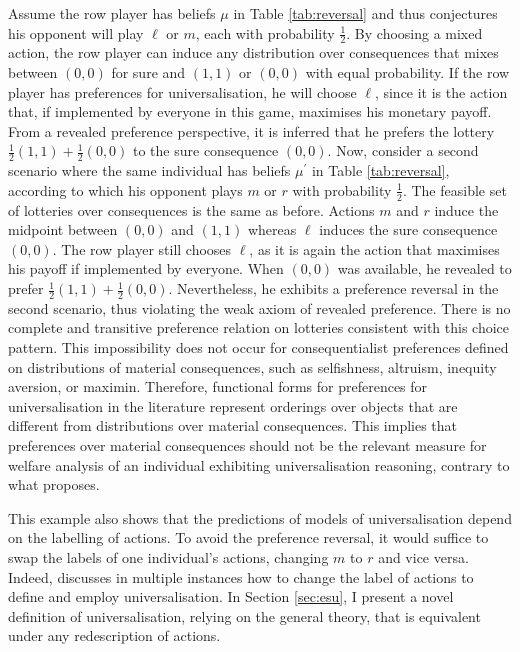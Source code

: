 Assume the row player has beliefs \(\mu\) in Table \ref{tab:reversal} and thus conjectures his opponent will play \(\ell\) or \(m\), each with probability \(\frac{1}{2}\). By choosing a mixed action, the row player can induce any distribution over consequences that mixes between \((0,0)\) for sure and \((1,1)\) or \((0,0)\) with equal probability. If the row player has preferences for universalisation, he will choose \(\ell\), since it is the action that, if implemented by everyone in this game, maximises his monetary payoff. From a revealed preference perspective, it is inferred that he prefers the lottery \(\frac{1}{2} (1,1 ) + \frac{1}{2} (0,0 )\) to the sure consequence \((0,0 )\). Now, consider a second scenario where the same individual has beliefs \(\mu^{\prime}\) in Table \ref{tab:reversal}, according to which his opponent plays \(m\) or \(r\) with probability \(\frac{1}{2}\). The feasible set of lotteries over consequences is the same as before. Actions \(m\) and \(r\) induce the midpoint between \((0,0 )\) and \((1,1 )\) whereas \(\ell\) induces the sure consequence \((0,0)\). The row player still chooses \(\ell\), as it is again the action that maximises his payoff if implemented by everyone. When \((0,0)\) was available, he revealed to prefer \(\frac{1}{2} (1,1 ) + \frac{1}{2} (0,0 )\). Nevertheless, he exhibits a preference reversal in the second scenario, thus violating the weak axiom of revealed preference. There is no complete and transitive preference relation on lotteries consistent with this choice pattern. This impossibility does not occur for consequentialist preferences defined on distributions of material consequences, such as selfishness, altruism, inequity aversion, or maximin. Therefore, functional forms for preferences for universalisation in the literature represent orderings over objects that are different from distributions over material consequences. This implies that preferences over material consequences should not be the relevant measure for welfare analysis of an individual exhibiting universalisation reasoning, contrary to what \cite{roemer2019we} proposes.

This example also shows that the predictions of models of universalisation depend on the labelling of actions. To avoid the preference reversal, it would suffice to swap the labels of one individual's actions, changing \( m \) to \( r \) and vice versa. Indeed, \cite{roemer2019we} discusses in multiple instances how to change the label of actions to define and employ universalisation. In Section \ref{sec:esu}, I present a novel definition of universalisation, relying on the general theory, that is equivalent under any redescription of actions.

